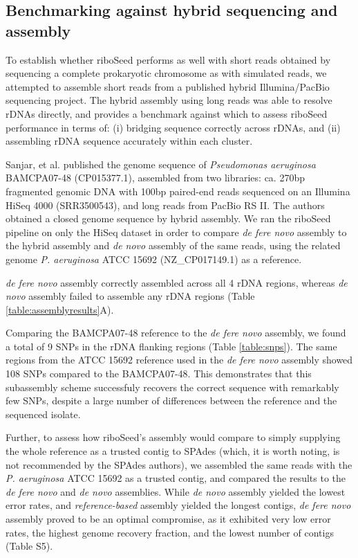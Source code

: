 \documentclass[a4,center,fleqn]{NAR}
\begin{document}
\subsection*{Benchmarking against hybrid sequencing and assembly}

To establish whether riboSeed performs as well with short reads obtained by sequencing a complete prokaryotic chromosome as with simulated reads, we attempted to assemble short reads from a published hybrid Illumina/PacBio sequencing project. The hybrid assembly using long reads was able to resolve rDNAs directly, and provides a benchmark against which to assess riboSeed performance in terms of: (i) bridging sequence correctly across rDNAs, and (ii) assembling rDNA sequence accurately within each cluster.


Sanjar, et al. published the genome sequence of \textit{Pseudomonas aeruginosa} BAMCPA07-48 (CP015377.1)\cite{Sanjar2016}, assembled from two libraries: ca. 270bp fragmented genomic DNA with 100bp paired-end reads sequenced on an Illumina HiSeq 4000 (SRR3500543), and long reads from PacBio RS II. The authors obtained a closed genome sequence by hybrid assembly. We ran the riboSeed pipeline on only the HiSeq dataset in order to compare \textit{de fere novo} assembly to the hybrid assembly and \textit{de novo} assembly of the same reads, using the related genome \textit{P. aeruginosa} ATCC 15692 (NZ\_CP017149.1) as a reference.

\textit{de fere novo} assembly correctly assembled across all 4 rDNA regions, whereas \textit{de novo} assembly failed to assemble any rDNA regions (Table \ref{table:assemblyresults}A).

Comparing the BAMCPA07-48 reference to the \textit{de fere novo} assembly, we found a total of 9 SNPs in the rDNA flanking regions (Table \ref{table:snps}). The same regions from the ATCC 15692 reference used in the \textit{de fere novo} assembly showed 108 SNPs compared to the BAMCPA07-48.  This demonstrates that this subassembly scheme successfuly recovers the correct sequence with remarkably few SNPs, despite a large number of differences between the reference and the sequenced isolate.

Further, to assess how riboSeed's assembly would compare to simply supplying the whole reference as a trusted contig to SPAdes (which, it is worth noting, is not recommended by the SPAdes authors), we assembled the same reads with the \textit{P. aeruginosa} ATCC 15692 as a trusted contig, and compared the results to the \textit{de fere novo} and \textit{de novo} assemblies. While \textit{de novo} assembly yielded the lowest error rates, and \textit{reference-based}  assembly yielded the longest contigs, \textit{de fere novo} assembly proved to be an optimal compromise, as it exhibited very low error rates, the highest genome recovery fraction, and the lowest number of contigs (Table S5).
\end{document}

